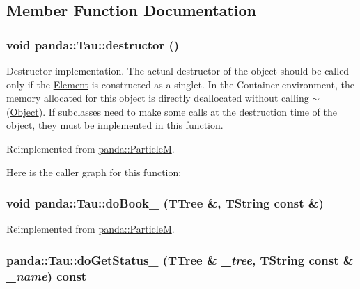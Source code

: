 \subsection{Member Function Documentation}
\hypertarget{classpanda_1_1Tau_a7caf1a64e1c468e27a6a88c34ab97457}{
\subsubsection[{destructor}]{\setlength{\rightskip}{0pt plus 5cm}void panda::Tau::destructor ()}}
\label{classpanda_1_1Tau_a7caf1a64e1c468e27a6a88c34ab97457}


Destructor implementation. The actual destructor of the object should be called only if the \hyperlink{classpanda_1_1Element}{Element} is constructed as a singlet. In the Container environment, the memory allocated for this object is directly deallocated without calling $\sim$(\hyperlink{classpanda_1_1Object}{Object}). If subclasses need to make some calls at the destruction time of the object, they must be implemented in this \hyperlink{namespacepanda_1_1function}{function}. 

Reimplemented from \hyperlink{classpanda_1_1ParticleM_abef15d28e6e33ee92c0b318bd41af2ca}{panda::ParticleM}.

Here is the caller graph for this function:\hypertarget{classpanda_1_1Tau_a223ddb7af7f072bdb8973676cdb69004}{
\subsubsection[{doBook\_\-}]{\setlength{\rightskip}{0pt plus 5cm}void panda::Tau::doBook\_\- (TTree \&, \/  TString const \&)}}
\label{classpanda_1_1Tau_a223ddb7af7f072bdb8973676cdb69004}


Reimplemented from \hyperlink{classpanda_1_1ParticleM_a55d6e7e91edbc88e980a0031c299ef18}{panda::ParticleM}.\hypertarget{classpanda_1_1Tau_ad81f7bd9caddfbc5773bd20f5f4a227f}{
\subsubsection[{doGetStatus\_\-}]{ panda::Tau::doGetStatus\_\- (TTree \& {\em \_\-tree}, \/  TString const \& {\em \_\-name}) const}}
\label{classpanda_1_1Tau_ad81f7bd9caddfbc5773bd20f5f4a227f}


